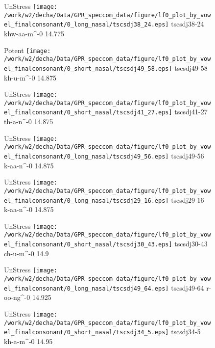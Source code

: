 \documentclass{article}
\begin{document}
\begin{figure}[t]
\begin{minipage}[b]{.24\textwidth}
UnStress
\centering
\texttt{[image: /work/w2/decha/Data/GPR\_speccom\_data/figure/lf0\_plot\_by\_vowel\_finalconsonant/0\_long\_nasal/tscsdj38\_24.eps]}
tscsdj38-24 khw-aa-m\textasciicircum-0 14.775
\end{minipage}
\begin{minipage}[b]{.24\textwidth}
\colorbox{Apricot}{Potent}
\centering
\texttt{[image: /work/w2/decha/Data/GPR\_speccom\_data/figure/lf0\_plot\_by\_vowel\_finalconsonant/0\_short\_nasal/tscsdj49\_58.eps]}
tscsdj49-58 kh-u-m\textasciicircum-0 14.875
\end{minipage}
\begin{minipage}[b]{.24\textwidth}
UnStress
\centering
\texttt{[image: /work/w2/decha/Data/GPR\_speccom\_data/figure/lf0\_plot\_by\_vowel\_finalconsonant/0\_short\_nasal/tscsdj41\_27.eps]}
tscsdj41-27 th-a-n\textasciicircum-0 14.875
\end{minipage}
\begin{minipage}[b]{.24\textwidth}
UnStress
\centering
\texttt{[image: /work/w2/decha/Data/GPR\_speccom\_data/figure/lf0\_plot\_by\_vowel\_finalconsonant/0\_long\_nasal/tscsdj49\_56.eps]}
tscsdj49-56 k-aa-n\textasciicircum-0 14.875
\end{minipage}
\end{figure}

\begin{figure}[t]
\begin{minipage}[b]{.24\textwidth}
UnStress
\centering
\texttt{[image: /work/w2/decha/Data/GPR\_speccom\_data/figure/lf0\_plot\_by\_vowel\_finalconsonant/0\_long\_nasal/tscsdj29\_16.eps]}
tscsdj29-16 k-aa-n\textasciicircum-0 14.875
\end{minipage}
\begin{minipage}[b]{.24\textwidth}
UnStress
\centering
\texttt{[image: /work/w2/decha/Data/GPR\_speccom\_data/figure/lf0\_plot\_by\_vowel\_finalconsonant/0\_short\_nasal/tscsdj30\_43.eps]}
tscsdj30-43 ch-u-m\textasciicircum-0 14.9
\end{minipage}
\begin{minipage}[b]{.24\textwidth}
UnStress
\centering
\texttt{[image: /work/w2/decha/Data/GPR\_speccom\_data/figure/lf0\_plot\_by\_vowel\_finalconsonant/0\_long\_nasal/tscsdj49\_64.eps]}
tscsdj49-64 r-oo-ng\textasciicircum-0 14.925
\end{minipage}
\begin{minipage}[b]{.24\textwidth}
UnStress
\centering
\texttt{[image: /work/w2/decha/Data/GPR\_speccom\_data/figure/lf0\_plot\_by\_vowel\_finalconsonant/0\_short\_nasal/tscsdj34\_5.eps]}
tscsdj34-5 kh-a-m\textasciicircum-0 14.95
\end{minipage}
\end{figure}
\end{document}

